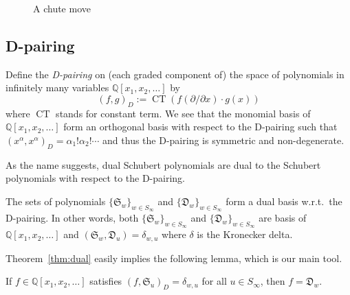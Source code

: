 \documentclass[ALCO,ThmDefs,Unicode,epreuves]{cedram}
\newcommand{\D}{\mathfrak{D}}
\newcommand{\Q}{\mathbb{Q}}
\DeclareMathOperator{\CT}{CT}
\begin{document}
\begin{figure}[htb]
\centering
{}
\caption{A chute move}
\label{fig:chute}
\end{figure}


\subsection{D-pairing}
Define the \emph{D-pairing} on (each graded component of) the space of polynomials in infinitely many variables $\Q[x_1,x_2,\ldots]$ by
\[
(f,g)_D:=\CT(f(\partial/\partial x)\cdot g(x))
\]
where $\CT$ stands for constant term. We see that the monomial basis of $\Q[x_1,x_2,\ldots]$ form an orthogonal basis with respect to the D-pairing such that $(x^{\alpha},x^{\alpha})_D=\alpha_1!\alpha_2!\cdots$ and thus the D-pairing is symmetric and non-degenerate.

As the name suggests, dual Schubert polynomials are dual to the Schubert polynomials with respect to the D-pairing.
\begin{theorem}\label{thm:dual}
The sets of polynomials $\{\mathfrak{S}_w\}_{w\in S_{\infty}}$ and $\{\D_w\}_{w\in S_{\infty}}$ form a dual basis w.r.t.\ the D-pairing. In other words, both $\{\mathfrak{S}_w\}_{w\in S_{\infty}}$ and $\{\D_w\}_{w\in S_{\infty}}$ are basis of $\Q[x_1,x_2,\ldots]$ and $(\mathfrak{S}_w,\D_u)=\delta_{w,u}$ where $\delta$ is the Kronecker delta. 
\end{theorem}
Theorem~\ref{thm:dual} easily implies the following lemma, which is our main tool.
\begin{lemma}\label{lem:basis}
If $f\in\Q[x_1,x_2,\ldots]$ satisfies $(f,\mathfrak{S}_u)_D=\delta_{w,u}$ for all $u\in S_{\infty}$, then $f=\D_w$.
\end{lemma}
\end{document}
